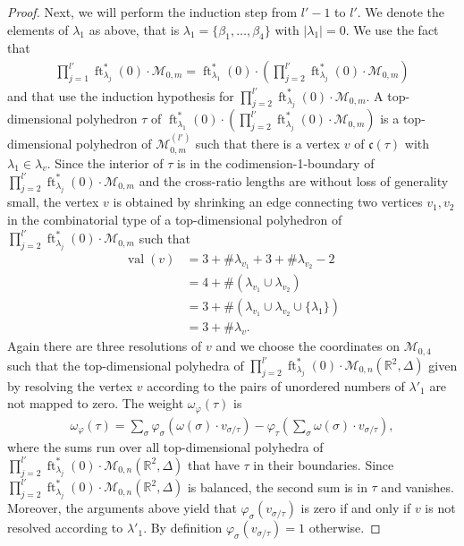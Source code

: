 \documentclass[11pt,reqno,a4]{amsart}
\theoremstyle{dotless}
\theoremstyle{definition}
\newcommand{\ft}{\operatorname{ft}}
\newcommand{\val}{\operatorname{val}}
\begin{document}
\begin{proof}
Next, we will perform the induction step from $l'-1$ to $l'$. We denote the elements of $\lambda_1$ as above, that is $\lambda_1=\lbrace\beta_1,\dots,\beta_4\rbrace$ with $|\lambda_1|=0$. We use the fact that
\begin{align*}
\prod_{j=1}^{l'}\ft_{\lambda_j}^*\left( 0\right)\cdot\mathcal{M}_{0,m}
=
\ft_{\lambda_1}^*\left( 0\right)\cdot\left(\prod_{j=2}^{l'}\ft_{\lambda_j}^*\left( 0\right)\cdot\mathcal{M}_{0,m}\right)
\end{align*}
and that use the induction hypothesis for $\prod_{j=2}^{l'}\ft_{\lambda_j}^*\left( 0\right)\cdot\mathcal{M}_{0,m}$. A top-dimensional polyhedron $\tau$ of $\ft_{\lambda_1}^*\left( 0\right)\cdot\left(\prod_{j=2}^{l'}\ft_{\lambda_j}^*\left( 0\right)\cdot\mathcal{M}_{0,m}\right)$ is a top-dimensional polyhedron of $\mathcal{M}_{0,m}^{(l')}$ such that there is a vertex $v$ of $\mathfrak{c}(\tau)$ with $\lambda_1\in\lambda_v$. Since the interior of $\tau$ is in the codimension-1-boundary of $\prod_{j=2}^{l'}\ft_{\lambda_j}^*\left( 0\right)\cdot\mathcal{M}_{0,m}$ and the cross-ratio lengths are without loss of generality small, the vertex $v$ is obtained by shrinking an edge connecting two vertices $v_1,v_2$ in the combinatorial type of a top-dimensional polyhedron of $\prod_{j=2}^{l'}\ft_{\lambda_j}^*\left( 0\right)\cdot\mathcal{M}_{0,m}$ such that
\begin{align*}
\val(v)&=3+\# \lambda_{v_1}+3+\# \lambda_{v_2} -2\\
&=4+\#\left( \lambda_{v_1}\cup\lambda_{v_2}\right)\\
&=3+\#\left( \lambda_{v_1}\cup\lambda_{v_2}\cup\lbrace \lambda_1\rbrace\right)\\
&=3+\#\lambda_v.
\end{align*}
 Again there are three resolutions of $v$ and we choose the coordinates on $\mathcal{M}_{0,4}$ such that the top-dimensional polyhedra of $\prod_{j=2}^{l'}\ft_{\lambda_j}^*\left( 0\right)\cdot\mathcal{M}_{0,n}\left(\mathbb{R}^2,\Delta \right)$  given by resolving the vertex $v$ according to the pairs of unordered numbers of $\lambda'_1$ are not mapped to zero.  The weight $\omega_\varphi(\tau)$ is 
\begin{align*}
\omega_\varphi(\tau)=\sum_{\sigma}\varphi_\sigma\left(\omega(\sigma)\cdot v_{\sigma/\tau}\right)-
\varphi_{\tau}\left( \sum_{\sigma} \omega(\sigma)\cdot v_{\sigma/\tau} \right),
\end{align*}
where the sums run over all top-dimensional polyhedra of $\prod_{j=2}^{l'}\ft_{\lambda_j}^*\left( 0\right)\cdot\mathcal{M}_{0,n}\left(\mathbb{R}^2,\Delta \right)$ that have $\tau$ in their boundaries. Since $\prod_{j=2}^{l'}\ft_{\lambda_j}^*\left( 0\right)\cdot\mathcal{M}_{0,n}\left(\mathbb{R}^2,\Delta \right)$ is balanced, the second sum is in $\tau$ and vanishes. Moreover, the arguments above yield that $\varphi_\sigma\left(v_{\sigma/\tau}\right)$ is zero if and only if $v$ is not resolved according to $\lambda'_1$. By definition $\varphi_\sigma\left(v_{\sigma/\tau}\right)=1$ otherwise.
\end{proof}
\end{document}
